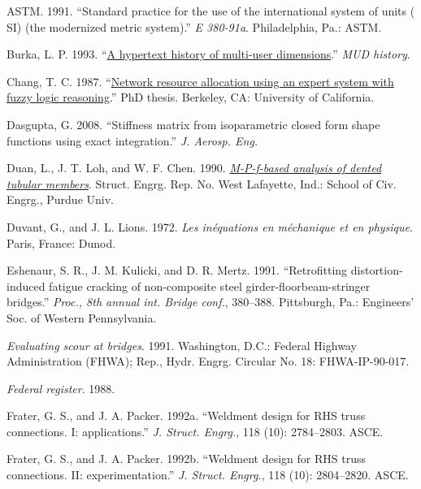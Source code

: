 \documentclass[NewProceedings, InsideFigs,LineNumbers]{asce-quarto}
\newlength{\cslhangindent}
\newenvironment{CSLReferences}[2] %
 {\begin{list}{}{%
  \setlength{\itemindent}{0pt}
  \setlength{\leftmargin}{0pt}
  \setlength{\parsep}{0pt}
  \ifodd #1
   \setlength{\leftmargin}{\cslhangindent}
   \setlength{\itemindent}{-1\cslhangindent}
  \fi
  \setlength{\itemsep}{#2\baselineskip}}}
 {\end{list}}
\begin{document}
\label{refs}
\begin{CSLReferences}{1}{0}
ASTM. 1991. {``Standard practice for the use of the international system
of units ({ SI}) (the modernized metric system).''} \emph{E 380-91a}.
Philadelphia, Pa.: ASTM.

Burka, L. P. 1993. {``\href{http://www.ccs.neu.edu}{A hypertext history
of multi-user dimensions}.''} \emph{MUD history}.

Chang, T. C. 1987. {``\href{}{Network resource allocation using an
expert system with fuzzy logic reasoning}.''} PhD thesis. Berkeley, CA:
University of California.

Dasgupta, G. 2008. {``Stiffness matrix from isoparametric closed form
shape functions using exact integration.''} \emph{J. Aerosp. Eng.}

Duan, L., J. T. Loh, and W. F. Chen. 1990. \emph{\href{}{M-{P}-f-based
analysis of dented tubular members}}. Struct. Engrg. Rep. No. West
Lafayette, Ind.: School of Civ. Engrg., Purdue Univ.

Duvant, G., and J. L. Lions. 1972. \emph{Les in{é}quations en
m{é}chanique et en physique}. Paris, France: Dunod.

Eshenaur, S. R., J. M. Kulicki, and D. R. Mertz. 1991. {``Retrofitting
distortion-induced fatigue cracking of non-composite steel
girder-floorbeam-stringer bridges.''} \emph{Proc., 8th annual int.
Bridge conf.}, 380--388. Pittsburgh, Pa.: Engineers' Soc. of Western
Pennsylvania.

\emph{Evaluating scour at bridges}. 1991. Washington, D.C.: Federal
Highway Administration (FHWA); Rep., Hydr. Engrg. Circular No. 18:
FHWA-IP-90-017.

\emph{Federal register}. 1988.

Frater, G. S., and J. A. Packer. 1992a. {``Weldment design for {RHS}
truss connections. {I}: applications.''} \emph{J. Struct. Engrg.}, 118
(10): 2784--2803. ASCE.

Frater, G. S., and J. A. Packer. 1992b. {``Weldment design for {RHS}
truss connections. {II}: experimentation.''} \emph{J. Struct. Engrg.},
118 (10): 2804--2820. ASCE.


\end{CSLReferences}
\end{document}
